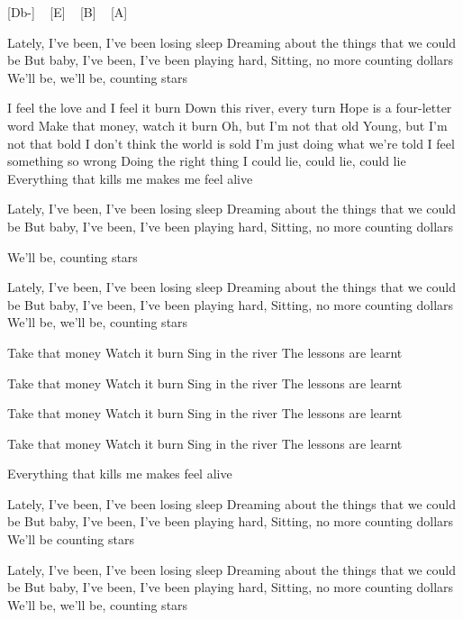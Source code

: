 

[Db-] ~ [E] ~ [B] ~ [A]~

 Lately, I've been, I've been losing sleep
Dreaming about the things that we could be
But baby, I've been, I've been playing hard,
Sitting, no more counting dollars
We'll be, we'll be, counting stars


I feel the love and I feel it burn
Down this river, every turn
Hope is a four-letter word
Make that money, watch it burn
Oh, but I'm not that old
Young, but I'm not that bold
I don't think the world is sold
I'm just doing what we're told
I feel something so wrong
Doing the right thing
I could lie, could lie, could lie
Everything that kills me makes me feel alive

Lately, I've been, I've been losing sleep
Dreaming about the things that we could be
But baby, I've been, I've been playing hard,
Sitting, no more counting dollars

We'll be, counting stars

Lately, I've been, I've been losing sleep
Dreaming about the things that we could be
But baby, I've been, I've been playing hard,
Sitting, no more counting dollars
We'll be, we'll be, counting stars

Take that money
Watch it burn
Sing in the river
The lessons are learnt

Take that money
Watch it burn
Sing in the river
The lessons are learnt


Take that money
Watch it burn
Sing in the river
The lessons are learnt

Take that money
Watch it burn
Sing in the river
The lessons are learnt

Everything that kills me makes feel alive

Lately, I've been, I've been losing sleep
Dreaming about the things that we could be
But baby, I've been, I've been playing hard,
Sitting, no more counting dollars
We'll be counting stars


Lately, I've been, I've been losing sleep
Dreaming about the things that we could be
But baby, I've been, I've been playing hard,
Sitting, no more counting dollars
We'll be, we'll be, counting stars

